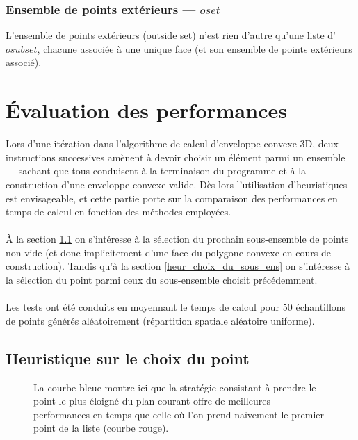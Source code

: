\documentclass[]{article}
\begin{document}
\begin{multicols}{2}
	\subsubsection{Ensemble de points extérieurs — $oset$}
	L'ensemble de points extérieurs (outside set) n'est rien d'autre qu'une liste d'$osubset$, chacune associée à une unique face (et son ensemble de points extérieurs associé).
	

\section{Évaluation des performances}
	Lors d'une itération dans l'algorithme de calcul d'enveloppe convexe 3D, deux instructions successives amènent à devoir choisir un élément parmi un ensemble — sachant que tous conduisent à la terminaison du programme et à la construction d'une enveloppe convexe valide. Dès lors l'utilisation d'heuristiques est envisageable, et cette partie porte sur la comparaison des performances en temps de calcul en fonction des méthodes employées.\\\\
	À la section \ref{heur_choix_du_point} on s'intéresse à la sélection du prochain sous-ensemble de points non-vide (et donc implicitement d'une face du polygone convexe en cours de construction).
	Tandis qu'à la section \ref{heur_choix_du_sous_ens} on s'intéresse à la sélection du point parmi ceux du sous-ensemble choisit précédemment.\\\\
	Les tests ont été conduits en moyennant le temps de calcul pour 50 échantillons de points générés aléatoirement (répartition spatiale aléatoire uniforme).
	
	\subsection{Heuristique sur le choix du point}\label{heur_choix_du_point}
	\begin{figure}[H]
		\caption{La courbe bleue montre ici que la stratégie consistant à prendre le point le plus éloigné du plan courant offre de meilleures performances en temps que celle où l'on prend naïvement le premier point de la liste (courbe rouge).}
	\end{figure}


\end{multicols}
\end{document}
